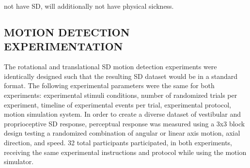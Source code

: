 \documentclass[11pt, onecolumn]{article}
\begin{document}
not have SD, will additionally not have physical sickness.

\subsection{MOTION DETECTION EXPERIMENTATION}
The rotational and translational SD motion detection experiments were identically designed such that the resulting SD dataset would be in a standard format.  The following experimental parameters were the same for both experiments: experimental stimuli conditions, number of randomized trials per experiment, timeline of experimental events per trial, experimental protocol, motion simulation system.  In order to create a diverse dataset of vestibular and proprioceptive SD response, perceptual response was measured using a 3x3 block design testing a randomized combination of angular or linear axis motion, axial direction, and speed.  32 total participants participated, in both experiments, receiving the same experimental instructions and protocol while using the motion simulator.
\end{document}
